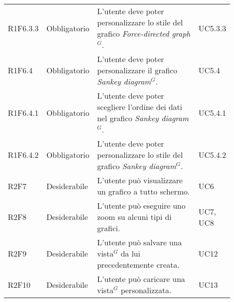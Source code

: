 {\begin{longtable}{p{0.12\linewidth}p{0.15\linewidth}p{0.50\linewidth}p{0.15\linewidth}}
    \rowcolor[RGB]{233, 245, 206}
    R1F6.3.3 & Obbligatorio & L'utente deve poter personalizzare lo stile del grafico \textit{Force-directed graph$^{G}$}. & UC5.3.3\\
    \rowcolor[RGB]{216, 235, 171}
    R1F6.4 & Obbligatorio & L'utente deve poter personalizzare il grafico \textit{Sankey diagram$^{G}$}. & UC5.4\\
    \rowcolor[RGB]{233, 245, 206}
    R1F6.4.1 & Obbligatorio & L'utente deve poter scegliere l'ordine dei dati nel grafico \textit{Sankey diagram$^{G}$}. & UC5.4.1\\
    \rowcolor[RGB]{216, 235, 171}
    R1F6.4.2 & Obbligatorio & L'utente deve poter personalizzare lo stile del grafico \textit{Sankey diagram$^{G}$}. & UC5.4.2\\

    \rowcolor[RGB]{233, 245, 206}
    R2F7 & Desiderabile & L'utente può visualizzare un grafico a tutto schermo. & UC6\\
    
    \rowcolor[RGB]{216, 235, 171}
    R2F8 & Desiderabile & L'utente può eseguire uno zoom su alcuni tipi di grafici. & UC7, UC8\\
    
    \rowcolor[RGB]{233, 245, 206}
    R2F9 & Desiderabile & L'utente può salvare una vista$^{G}$ da lui precedentemente creata. & UC12\\
    
    \rowcolor[RGB]{216, 235, 171}
    R2F10 & Desiderabile & L'utente può caricare una vista$^{G}$ personalizzata.  & UC13\\


\end{longtable}}
